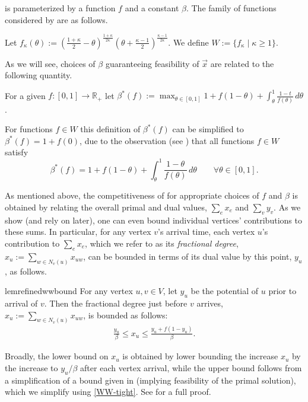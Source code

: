  is parameterized by a function $f$ and a constant $\beta$. The family of functions considered by \cite{wang2015two} are as follows.
\begin{Def}
	Let $f_{\kappa}(\theta) := \left( \frac{1+ \kappa}{2}  - \theta  \right)^{\frac{1 + \kappa}{2 \kappa}} 
	\left( \theta +  \frac{\kappa - 1}{2}\right)^{\frac{\kappa - 1}{2 \kappa}}$.
	We define $W := \{ f_{\kappa} \mid \kappa \geq 1 \}$.
\end{Def}

As we will see, choices of $\beta$ guaranteeing feasibility of $\vec{x}$ are related to the following quantity.
\begin{Def}
For a given $f : \left[ 0,1 \right]  \xrightarrow{}  \mathbb{R}_{+} $    let $\beta^*(f) := \max_{\theta \in \left[ 0,1 \right]} 1 +  f(1-\theta)+  \int_{\theta}^{1} \frac{1-t}{f(\theta)} \,d\theta$.
\end{Def}

For functions $f\in W$ this definition of $\beta^*(f)$ can be simplified to $\beta^*(f)=1+f(0)$, due to the observation  (see \cite[Lemmas 4,5]{wang2015two}) that all functions $f\in W$ satisfy 
\begin{equation}\label{WW-tight}
	\beta^*(f) = 1+f(1-\theta)+\int_{\theta}^1 \frac{1-\theta}{f(\theta)}\,d\theta \qquad \forall \theta\in [0,1].
\end{equation} 


As mentioned above, the competitiveness of  for appropriate choices of $f$ and $\beta$ is obtained by relating the overall primal and dual values, $\sum_e x_e$ and $\sum_v y_v$. As we show (and rely on later), one can even bound individual vertices' contributions to these sums. In particular, for any vertex $v$'s arrival time, each vertex $u$'s contribution to $\sum_e x_e$, which we refer to as its \emph{fractional degree}, $x_u := \sum_{w\in N_v(u)} x_{uw}$, can be bounded in terms of its dual value by this point, $y_u$, as follows.

\begin{restatable}{lem}{refinedwwbound}\label{refined-ww-xu-bound}
For any vertex $u,v \in V $, let $y_u$ be the potential of $u$ prior to arrival of $v$. Then the fractional degree just before $v$ arrives,  $x_u:=\sum_{w\in N_v(u)} x_{uw}$, is bounded as follows:
\begin{align*}
\frac{y_u}{\beta} \leq	x_u  \leq \frac{y_u + f(1-y_u)}{\beta}.
\end{align*}
\end{restatable}
Broadly, the lower bound on $x_u$ is obtained by lower bounding the increase $x_u$ by the increase to $y_u/\beta$ after each vertex arrival, while the upper bound follows from a simplification of a bound given in \cite[Invariant 1]{wang2015two} (implying feasibility of the primal solution), which we simplify using \eqref{WW-tight}. See  for a full proof.

